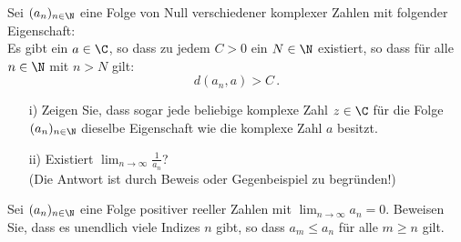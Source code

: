 
\aufgabe{} Sei $(a_n)_{n\in\N}$ eine Folge von Null verschiedener komplexer Zahlen mit folgender Eigenschaft:\\
Es gibt ein $a\in\C$, so dass zu jedem $C>0$ ein $N\in\N$ existiert, so dass für alle $n\in\N$ mit $n>N$ gilt:
$$d(a_n,a)>C\,.$$
\begin{itemize}
	\item[i)] Zeigen Sie, dass sogar jede beliebige komplexe Zahl $z\in\C$ für die Folge $(a_n)_{n\in\N}$ dieselbe Eigenschaft wie die komplexe Zahl $a$ besitzt.
	\item[ii)] Existiert $\displaystyle \lim_{n\rightarrow\infty}\frac{1}{a_n}$?\\[0.3em]
	(Die Antwort ist durch Beweis oder Gegenbeispiel zu begründen!)
\end{itemize}

\aufgabe{} Sei $(a_n)_{n\in\N}$ eine Folge positiver reeller Zahlen mit $\lim_{n\rightarrow\infty}a_n=0$. Beweisen Sie, dass es unendlich viele Indizes $n$ gibt, so dass $a_m\leq a_n$ für alle $m\geq n$ gilt.
